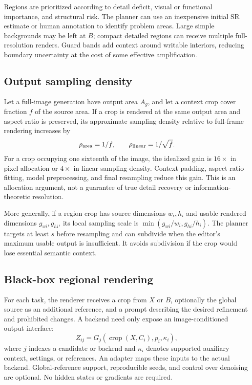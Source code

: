 \documentclass[10pt,twocolumn]{article}
\begin{document}
Regions are prioritized according to detail deficit, visual or functional importance, and structural risk. The planner can use an inexpensive initial SR estimate or human annotation to identify problem areas. Large simple backgrounds may be left at $B$; compact detailed regions can receive multiple full-resolution renders. Guard bands add context around writable interiors, reducing boundary uncertainty at the cost of some effective amplification.
\subsection{Output sampling density}
Let a full-image generation have output area $A_g$, and let a context crop cover fraction $f$ of the source area. If a crop is rendered at the same output area and aspect ratio is preserved, its approximate sampling density relative to full-frame rendering increases by
\begin{equation}
\rho_{\rm area}=1/f,\qquad \rho_{\rm linear}=1/\sqrt f.
\label{eq:density}
\end{equation}
For a crop occupying one sixteenth of the image, the idealized gain is $16\times$ in pixel allocation or $4\times$ in linear sampling density. Context padding, aspect-ratio fitting, model preprocessing, and final resampling reduce this gain. This is an allocation argument, not a guarantee of true detail recovery or information-theoretic resolution.

More generally, if a region crop has source dimensions $w_i,h_i$ and usable rendered dimensions $g_{wi},g_{hi}$, its local sampling scale is $\min(g_{wi}/w_i,g_{hi}/h_i)$. The planner targets at least $s$ before resampling and can subdivide when the editor's maximum usable output is insufficient. It avoids subdivision if the crop would lose essential semantic context.
\subsection{Black-box regional rendering}
For each task, the renderer receives a crop from $X$ or $B$, optionally the global source as an additional reference, and a prompt describing the desired refinement and prohibited changes. A backend need only expose an image-conditioned output interface:
\begin{equation}
Z_{ij}=G_j(\operatorname{crop}(X,C_i),p_i,\kappa_i),
\end{equation}
where $j$ indexes a candidate or backend and $\kappa_i$ denotes supported auxiliary context, settings, or references. An adapter maps these inputs to the actual backend. Global-reference support, reproducible seeds, and control over denoising are optional. No hidden states or gradients are required.
\end{document}

